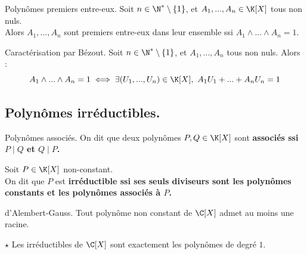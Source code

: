 \documentclass[11pt]{article}
\begin{document}
\vspace*{-0.8cm}

\begin{defi}{Polynômes premiers entre-eux.}{}
    Soit $n\in\N^*\setminus\{1\}$, et $A_1,...,A_n\in\K[X]$ tous non nuls.\\
    Alors $A_1,...,A_n$ sont premiers entre-eux dans leur ensemble ssi $A_1\land...\land A_n=1$.
\end{defi}

\vspace*{-0.8cm}

\begin{prop}{Caractérisation par Bézout.}{}
    Soit $n\in\N^*\setminus\{1\}$, et $A_1,...,A_n$ tous non nuls. Alors :
    \begin{equation*}
        A_1\land ... \land A_n = 1 \iff \exists (U_1,...,U_n)\in\K[X], ~ A_1U_1+...+A_nU_n=1
    \end{equation*}
\end{prop}

\vspace*{-0.8cm}

\subsection{Polynômes irréductibles.}

\begin{defi}{Polynômes associés.}{}
    On dit que deux polynômes $P,Q\in\K[X]$ sont \bf{associés} ssi $P\mid Q$ et $Q\mid P$.
\end{defi}

\vspace*{-0.8cm}

\begin{defi}{}{}
    Soit $P\in\K[X]$ non-constant.\\
    On dit que $P$ est \bf{irréductible} ssi ses seuls diviseurs sont les polynômes constants et les polynômes associés à $P$.
\end{defi}

\vspace*{-0.8cm}

\begin{thm}{d'Alembert-Gauss.}{}
    Tout polynôme non constant de $\C[X]$ admet au moins une racine.
\end{thm}

\vspace*{-0.8cm}

\begin{corr}{$\star$}{}
    Les irréductibles de $\C[X]$ sont exactement les polynômes de degré $1$.
\end{corr}
\end{document}

